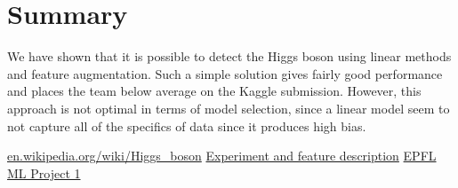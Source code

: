\documentclass[10pt,conference,compsocconf]{IEEEtran}
\begin{document}
\section{Summary}
We have shown that it is possible to detect the Higgs boson using linear methods and feature augmentation. Such a simple solution gives fairly good performance and places the team below average on the Kaggle submission. However, this approach is not optimal in terms of model selection, since a linear model seem to not capture all of the specifics of data since it produces high bias.
\begin{thebibliography}{99}
 \href{https://en.wikipedia.org/wiki/Higgs\_boson}{en.wikipedia.org/wiki/Higgs\_boson}
 \href{http://higgsml.lal.in2p3.fr/files/2014/04/documentation\_v1.8.pdf}{Experiment and feature description}
 \href{http://kaggle.com/c/epfml-higgs}{EPFL ML Project 1}
\end{thebibliography}
\end{document}
